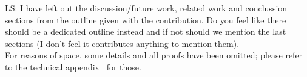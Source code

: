 \documentclass[compsoc,conference,letterpaper,fleqn]{IEEEtran}
\newcommand\lau[1]{{\color{purple} \sf \footnotesize {LS: #1}}\\}
\begin{document}
\lau{I have left out the discussion/future work, related work and conclussion sections from the outline given with the contribution. Do you feel like there should be a dedicated outline instead and if not should we mention the last sections (I don't feel it contributes anything to mention them).}

For reasons of space, some details and all proofs have been omitted;
please refer to the technical appendix~\cite{XXX} for those.



\end{document}
